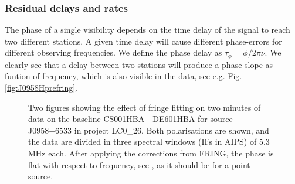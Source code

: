 \documentclass[graybox]{svmult}
\begin{document}
\subsubsection{Residual delays and rates}
The phase of a single visibility depends on the time delay of the signal to reach two
different stations. A given time delay will cause different phase-errors
for different observing frequencies. We define the phase delay as
$\tau_{\phi}=\phi / 2\pi\nu$. We clearly see that a delay between two
stations will produce a phase slope as funtion of frequency, which is also 
visible in the data, see e.g. Fig. \ref{fig:J0958Hprefring}.
\begin{figure}[htbp]
\centering
{}
\caption{
Two figures showing the effect of fringe fitting on two minutes of data on the
baseline CS001HBA - DE601HBA for source J0958+6533 in project LC0\_26. Both
polarisations are shown, and the data are divided in three spectral windows
(IFs in AIPS) of 5.3\,MHz each.  After applying the corrections from FRING, the
phase is flat with respect to frequency, see , as
it should be for a point source.
\label{fig:fringex}
}
\end{figure}
\end{document}
